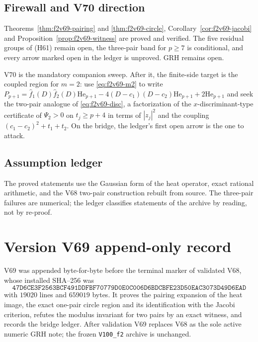 \documentclass[11pt]{article}
\theoremstyle{definition}
\theoremstyle{remark}
\begin{document}
\subsection*{Firewall and V70 direction}
\label{fire:f2v69}
Theorems~\ref{thm:f2v69-pairing} and \ref{thm:f2v69-circle},
Corollary~\ref{cor:f2v69-jacobi} and Proposition~\ref{prop:f2v69-witness}
are proved and verified.  The five residual groups of (H61) remain open,
the three-pair band for \(p\ge7\) is conditional, and every arrow marked
open in the ledger is unproved.  GRH remains open.

V70 is the mandatory companion sweep.  After it, the finite-side target
is the coupled region for \(m=2\): use \eqref{eq:f2v69-m2} to write
\(P_{p+1}=\widehat f_1(D)\widehat f_2(D)\mathrm{He}_{p+1}
-4(D-c_1)(D-c_2)\mathrm{He}_{p+1}+2\mathrm{He}_{p+1}\) and seek the
two-pair analogue of \eqref{eq:f2v69-disc}, a factorization of the
\(x\)-discriminant-type certificate of \(\Psi_2>0\) on \(t_j\ge p+4\) in
terms of \(|z_j|^2\) and the coupling \((c_1-c_2)^2+t_1+t_2\).  On the
bridge, the ledger's first open arrow is the one to attack.

\subsection*{Assumption ledger}
\label{ass:f2v69}
The proved statements use the Gaussian form of the heat operator, exact
rational arithmetic, and the V68 two-pair construction rebuilt from
source.  The three-pair failures are numerical; the ledger classifies
statements of the archive by reading, not by re-proof.
\endgroup

\section*{Version V69 append-only record}

V69 was appended byte-for-byte before the terminal marker of validated
V68, whose installed SHA--256 was
\[
 \texttt{47D6CE3F2563BCF491DDFBF70779D0E0}
 \allowbreak\texttt{C006D6BDCBFE23D50EAC3073D49D6EAD}
\]
with \(19020\) lines and \(659019\) bytes.  It proves the pairing
expansion of the heat image, the exact one-pair circle region and its
identification with the Jacobi criterion, refutes the modulus invariant
for two pairs by an exact witness, and records the bridge ledger.  After
validation V69 replaces V68 as the sole active numeric GRH note; the
frozen \texttt{V100\_f2} archive is unchanged.
\end{document}
